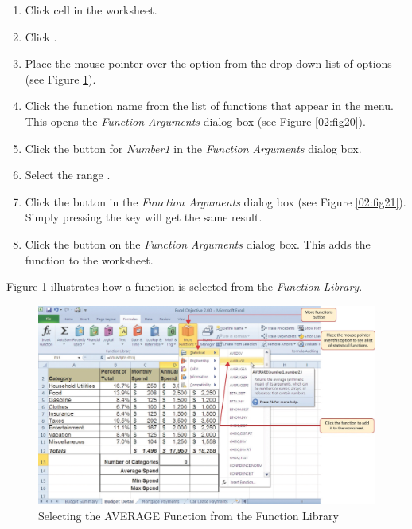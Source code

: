 \begin{enumerate}
	\item Click cell  in the  worksheet.
	\item Click .
	\item Place the mouse pointer over the  option from the drop-down list of options (see Figure \ref{02:fig19}).
	\item Click the  function name from the list of functions that appear in the menu. This opens the \textit{Function Arguments} dialog box (see Figure \ref{02:fig20}).
	\item Click the  button for \textit{Number1} in the \textit{Function Arguments} dialog box.
	\item Select the range .
	\item Click the  button in the \textit{Function Arguments} dialog box (see Figure \ref{02:fig21}). Simply pressing the  key will get the same result.
	\item Click the  button on the \textit{Function Arguments} dialog box. This adds the  function to the worksheet.
\end{enumerate}

Figure \ref{02:fig19} illustrates how a function is selected from the  \textit{Function Library}.

\begin{figure}[H]
	\centering
	\includegraphics[width=\maxwidth{.95\linewidth}]{gfx/ch02_fig19}
	\caption{Selecting the AVERAGE Function from the Function Library}
	\label{02:fig19}
\end{figure}

